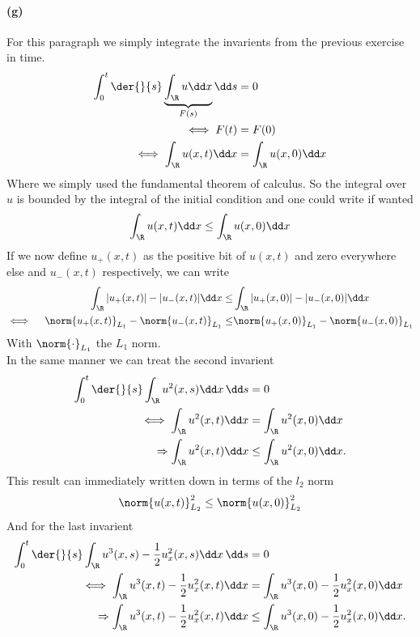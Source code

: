 \paragraph{(g)}
For this paragraph we simply integrate the invarients from the previous exercise in time. 
\begin{align}
\int_0^t \der{}{s}\underbrace{\int_\R u\dd x}_{F(s)}\dd s &= 0\\
\iff F(t) &= F(0)\\
\iff \int_\R u(x,t)\dd x&=\int_\R u(x,0) \dd x
\end{align}
Where we simply used the fundamental theorem of calculus. So the integral over $u$ is bounded by the integral of the initial condition and one could write if wanted
\begin{align}
\int_\R u(x,t)\dd x\leq\int_\R u(x,0) \dd x
\end{align}
If we now define $u_+(x,t)$ as the positive bit of $u(x,t)$ and zero everywhere else and $u_-(x,t)$ respectively, we can write 
\begin{align}
\int_\R |u_+(x,t)|-|u_-(x,t)|\dd x\leq&\int_\R  |u_+(x,0)|-|u_-(x,0)|\dd x\\
\iff \quad \norm{u_+(x,t)}_{L_1}-\norm{u_-(x,t)}_{L_1}\leq& \norm{u_+(x,0)}_{L_1}-\norm{u_-(x,0)}_{L_1}
\end{align}
With $\norm{\cdot}_{L_1}$ the $L_1$ norm.\\
In the same manner we can treat the second invarient
\begin{align}
\int_0^t \der{}{s}\int_\R u^2(x,s)\dd x\, \dd s& =0\\
\iff \int_\R u^2(x,t)\dd x &= \int_\R u^2(x,0)\dd x \\
\Rightarrow \int_\R u^2(x,t)\dd x &\leq \int_\R u^2(x,0)\dd x .
\end{align}
This result can immediately written down in terms of the $l_2$ norm
\begin{align}
\norm{u(x,t)}^2_{L_2}\leq \norm{u(x,0)}^2_{L_2}
\end{align}
And for the last invarient
\begin{align}
\int_0^t \der{}{s}\int_\R u^3(x,s)-\frac 12 u_x^2(x,s)\dd x\, \dd s& =0\\
\iff \int_\R u^3(x,t)-\frac 12 u_x^2(x,t)\dd x &= \int_\R u^3(x,0)-\frac 12 u_x^2(x,0)\dd x \\
\Rightarrow \int_\R u^3(x,t)-\frac 12 u_x^2(x,t)\dd x &\leq \int_\R u^3(x,0)-\frac 12 u_x^2(x,0)\dd x.
\end{align}